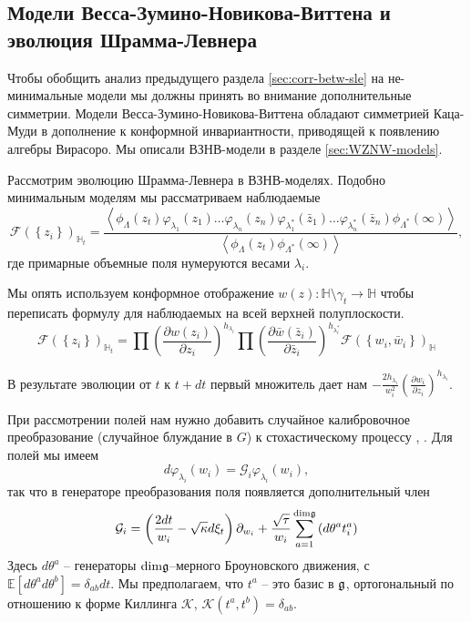 \subsection{Модели Весса-Зумино-Новикова-Виттена и эволюция Шрамма-Левнера}
\label{sec:sle-wzw-models}
Чтобы обобщить анализ предыдущего раздела  \ref{sec:corr-betw-sle} на не-минимальные модели мы должны принять во внимание дополнительные симметрии. Модели Весса-Зумино-Новикова-Виттена обладают симметрией Каца-Муди в дополнение к конформной инвариантности, приводящей к появлению алгебры Вирасоро. Мы описали ВЗНВ-модели в разделе \ref{sec:WZNW-models}. 

Рассмотрим эволюцию Шрамма-Левнера в ВЗНВ-моделях. 
Подобно минимальным моделям мы рассматриваем наблюдаемые
\begin{equation*}
  \mathcal{F}(\left\{z_{i}\right\})_{\mathbb{H}_{t}}=
  \frac{\left<\phi_{\Lambda}(z_{t}) \varphi_{\lambda_1}(z_{1}) \dots \varphi_{\lambda_n}(z_{n}) \varphi_{\lambda^{*}_1}(\bar z_{1}) \dots \varphi_{\lambda^{*}_n}(\bar z_{n})
      \phi_{\Lambda^{*}}(\infty)\right>}{\left<\phi_{\Lambda}(z_{t})\phi_{\Lambda^{*}}(\infty)\right>},
\end{equation*}
где примарные объемные поля нумеруются весами $\lambda_i$.

Мы опять используем конформное отображение  $w(z):\mathbb{H}\setminus\gamma_{t}\to \mathbb{H}$ чтобы переписать формулу для наблюдаемых на всей верхней полуплоскости.
\begin{equation}
  \mathcal{F}(\left\{z_{i}\right\})_{\mathbb{H}_{t}}=\prod \left(\frac{\partial w(z_{i})}{\partial z_{i}}\right)^{h_{\lambda_i}} 
  \prod \left(\frac{\partial \bar w(\bar z_{i})}{\partial \bar z_{i}}\right)^{h_{\lambda^{*}_i}}
  \mathcal{F}(\left\{w_{i}, \bar w_{i}\right\})_{\mathbb{H}}
  \label{eq:177}
\end{equation}

В результате эволюции от $t$ к $t+dt$ первый множитель дает нам $-\frac{2h_{\lambda_{i}}}{w_{i}^{2}}\left(\frac{\partial w_{i}}{\partial z_{i}}\right)^{h_{\lambda_{i}}}$.

При рассмотрении полей нам нужно добавить случайное калибровочное преобразование  (случайное блуждание в $G$) к стохастическому процессу \cite{bettelheim2005stochastic}, \cite{alekseev2010sle}. 
Для полей мы имеем
\begin{equation*}
  d\varphi_{\lambda_{i}}(w_{i}) = \mathcal{G}_{i}\varphi_{\lambda_{i}}(w_{i}),
\end{equation*}
так что в генераторе преобразования поля появляется дополнительный член
\begin{equation}
  \mathcal{G}_{i}=\left(\frac{2dt}{w_{i}}-\sqrt{\kappa} d\xi_{t}\right) \partial_{w_{i}}+\frac{\sqrt{\tau}}{w_{i}}\sum_{a=1}^{\mathrm{dim} \mathfrak{g}}\left(d \theta ^{a} t^{a}_{i}\right)
\label{eq:159}
\end{equation}
Здесь  $d\theta^{a}$ -- генераторы  $\mathrm{dim}\mathfrak{g}$--мерного Броуновского движения, с $\mathbb{E}[d\theta^{a}d\theta^{b}]=\delta_{ab}dt$. Мы предполагаем, что $t^{a}$ -- это базис в $\mathfrak{g}$, ортогональный по отношению к форме Киллинга $\mathcal{K}$, $\mathcal{K}(t^{a},t^{b})=\delta_{ab}$.


